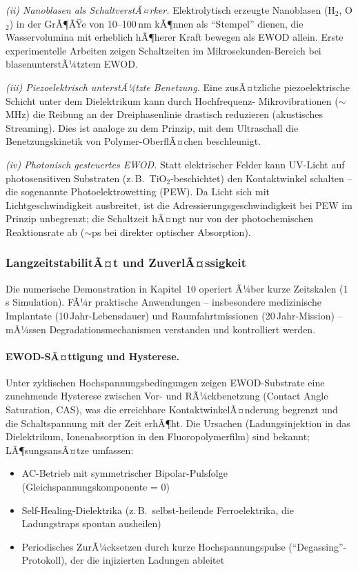 ﻿\documentclass[a4paper,12pt]{scrreprt}
\theoremstyle{definition}
\begin{document}
\textit{(ii) Nanoblasen als SchaltverstÃ¤rker.} Elektrolytisch erzeugte
Nanoblasen (H$_2$, O$_2$) in der GrÃ¶ÃŸe von 10--100\,nm kÃ¶nnen als
``Stempel'' dienen, die Wasservolumina mit erheblich hÃ¶herer Kraft
bewegen als EWOD allein. Erste experimentelle Arbeiten zeigen
Schaltzeiten im Mikrosekunden-Bereich bei blasenunterstÃ¼tztem EWOD.

\textit{(iii) Piezoelektrisch unterstÃ¼tzte Benetzung.} Eine zusÃ¤tzliche
piezoelektrische Schicht unter dem Dielektrikum kann durch Hochfrequenz-
Mikrovibrationen ($\sim$MHz) die Reibung an der Dreiphasenlinie
drastisch reduzieren (akustisches Streaming). Dies ist analoge zu dem
Prinzip, mit dem Ultraschall die Benetzungskinetik von Polymer-OberflÃ¤chen
beschleunigt.

\textit{(iv) Photonisch gesteuertes EWOD.} Statt elektrischer Felder
kann UV-Licht auf photosensitiven Substraten (z.\,B.\ TiO$_2$-beschichtet)
den Kontaktwinkel schalten -- die sogenannte Photoelektrowetting
(PEW). Da Licht sich mit Lichtgeschwindigkeit ausbreitet, ist die
Adressierungsgeschwindigkeit bei PEW im Prinzip unbegrenzt; die
Schaltzeit hÃ¤ngt nur von der photochemischen Reaktionsrate ab
($\sim$ps bei direkter optischer Absorption).

\subsubsection{LangzeitstabilitÃ¤t und ZuverlÃ¤ssigkeit}
\label{subsubsec:stabilitaet}

Die numerische Demonstration in Kapitel~10 operiert Ã¼ber kurze
Zeitskalen (1\,s Simulation). FÃ¼r praktische Anwendungen -- insbesondere
medizinische Implantate (10\,Jahr-Lebensdauer) und Raumfahrtmissionen
(20\,Jahr-Mission) -- mÃ¼ssen Degradationsmechanismen verstanden
und kontrolliert werden.

\paragraph{EWOD-SÃ¤ttigung und Hysterese.}
Unter zyklischen Hochspannungsbedingungen zeigen EWOD-Substrate eine
zunehmende Hysterese zwischen Vor- und RÃ¼ckbenetzung (Contact Angle
Saturation, CAS), was die erreichbare KontaktwinkelÃ¤nderung begrenzt
und die Schaltspannung mit der Zeit erhÃ¶ht. Die Ursachen (Ladungsinjek\-tion
in das Dielektrikum, Ionenabsorption in den Fluoropolymerfilm) sind
bekannt; LÃ¶sungsansÃ¤tze umfassen:
\begin{itemize}
	\item AC-Betrieb mit symmetrischer Bipolar-Pulsfolge
	(Gleichspannungskomponente = 0)
	\item Self-Healing-Dielektrika (z.\,B.\ selbst-heilende Ferroelektrika,
	die Ladungstraps spontan ausheilen)
	\item Periodisches ZurÃ¼cksetzen durch kurze Hochspannungspulse
	(``Degassing''-Protokoll), der die injizierten Ladungen ableitet
\end{itemize}
\end{document}
